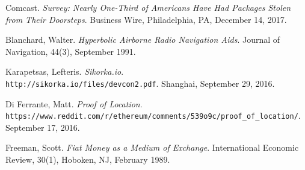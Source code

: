 \documentclass{article}
\begin{document}

\begin{thebibliography}{9}

Comcast.
\textit{Survey: Nearly One-Third of Americans Have Had Packages Stolen from Their Doorsteps}.
Business Wire, Philadelphia, PA, December 14, 2017.

Blanchard, Walter.
\textit{Hyperbolic Airborne Radio Navigation Aids}.
Journal of Navigation, 44(3), September 1991.

Karapetsas, Lefteris.
\textit{Sikorka.io}.
\\\texttt{http://sikorka.io/files/devcon2.pdf}.
Shanghai, September 29, 2016.

Di Ferrante, Matt.
\textit{Proof of Location}.
\\\texttt{https://www.reddit.com/r/ethereum/comments/539o9c/proof\_of\_location/}.
September 17, 2016.

Freeman, Scott.
\textit{Fiat Money as a Medium of Exchange}.
International Economic Review, 30(1), Hoboken, NJ, February 1989.
\end{thebibliography}

\clearpage

\printglossaries

\end{document}
